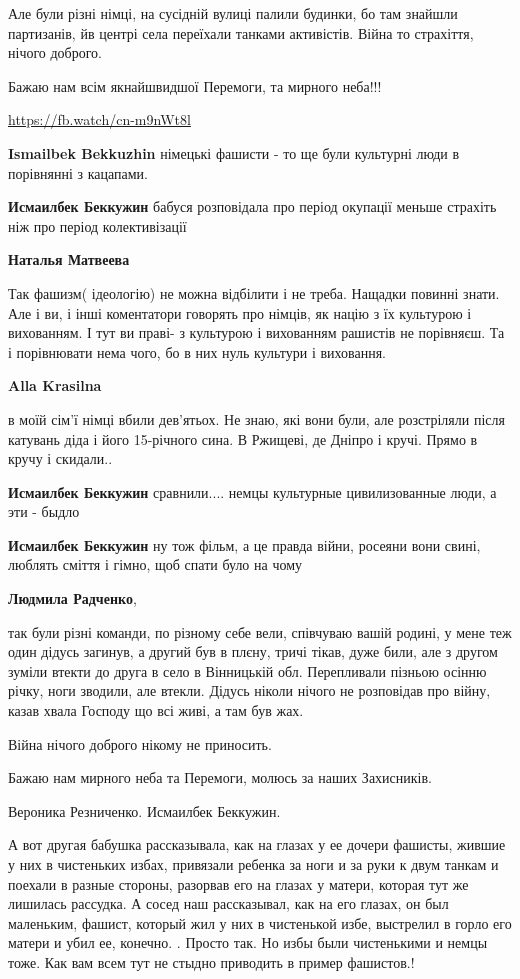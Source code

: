 \begin{itemize}
\begin{itemize}
Але були різні німці, на сусідній вулиці палили будинки, бо там знайшли
партизанів, йв центрі села переїхали танками активістів. Війна то страхіття,
нічого доброго.

Бажаю нам всім якнайшвидшої Перемоги, та мирного неба!!!

\url{https://fb.watch/cn-m9nWt8l}

\textbf{Ismailbek Bekkuzhin} німецькі фашисти - то ще були культурні люди в порівнянні з кацапами.

\textbf{Исмаилбек Беккужин} бабуся розповідала про період окупації меньше страхіть ніж про період колективізації

\textbf{Наталья Матвеева} 

Так фашизм( ідеологію) не можна відбілити і не треба. Нащадки повинні знати.
Але і ви, і інші коментатори говорять про німців, як націю з їх культурою і
вихованням. І тут ви праві- з культурою і вихованням рашистів не порівняєш. Та
і порівнювати нема чого, бо в них нуль культури і виховання.

\textbf{Alla Krasilna} 

в моїй сім'ї німці вбили дев'ятьох. Не знаю, які вони були, але розстріляли
після катувань діда і його 15-річного сина. В Ржищеві, де Дніпро і кручі.
Прямо в кручу і скидали..

\textbf{Исмаилбек Беккужин} сравнили.... немцы культурные цивилизованные люди, а эти - быдло

\textbf{Исмаилбек Беккужин} ну тож фільм, а це правда війни, росеяни вони свині, люблять сміття і гімно, щоб спати було на чому

\textbf{Людмила Радченко}, 

так були різні команди, по різному себе вели, співчуваю вашій родині, у мене
теж один дідусь загинув, а другий був в плєну, тричі тікав, дуже били, але з
другом зуміли втекти до друга в село в Вінницькій обл. Перепливали пізньою
осінню річку, ноги зводили, але втекли. Дідусь ніколи нічого не розповідав про
війну, казав хвала Господу що всі живі, а там був жах.

Війна нічого доброго нікому не приносить.

Бажаю нам мирного неба та Перемоги, молюсь за наших Захисників.

Вероника Резниченко. Исмаилбек Беккужин. 

А вот другая бабушка рассказывала, как на глазах у ее дочери фашисты, жившие у
них в чистеньких избах, привязали ребенка за ноги и за руки к двум танкам и
поехали в разные стороны, разорвав его на глазах у матери, которая тут же
лишилась рассудка. А сосед наш рассказывал, как на его глазах, он был
маленьким, фашист, который жил у них в чистенькой избе, выстрелил в горло его
матери и убил ее, конечно. . Просто так. Но избы были чистенькими и немцы тоже.
Как вам всем тут не стыдно приводить в пример фашистов.!


\end{itemize}
\end{itemize}
